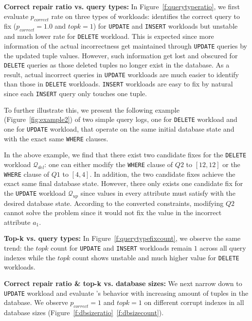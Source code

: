 \textbf{Correct repair ratio vs. query types: } In Figure~\ref{f:querytyperatio}, we first evaluate $p_{correct}$ rate on three types of workloads: \sys identifies the correct query to fix ($p_{correct} = 1.0$ and $topk = 1$) for \texttt{UPDATE} and \texttt{INSERT} workloads but unstable and much lower rate for \texttt{DELETE} workload. This is expected since more information of the actual incorrectness get maintained through \texttt{UPDATE} queries by the updated tuple values.  However, such information get lost and obscured for \texttt{DELETE} queries as those deleted tuples no longer exist in the database. As a result, actual incorrect queries in \texttt{UPDATE} workloads are much easier to identify than those in \texttt{DELETE} workloads. \texttt{INSERT} workloads are easy to fix by natural since each \texttt{INSERT} query only touches one tuple. 

To further illustrate this, we present the following  example (Figure~\ref{fig:example2}) of two simple query logs, one for \texttt{DELETE} workload and one for \texttt{UPDATE} workload, that operate on the same initial database state and with the exact same \texttt{WHERE} clauses. 

In the above example, we find that there exist two candidate fixes for the \texttt{DELETE} workload $\mathcal{Q}_{del}$: one can either modify the \texttt{WHERE} clause of $Q2$ to $[12, 12]$ or the \texttt{WHERE} clause of $Q1$ to $[4, 4]$. In addition, the two candidate fixes achieve the exact same final database state. However, there only exists one candidate fix for the \texttt{UPDATE} workload $\mathcal{Q}_{up}$ since values in every attribute must satisfy with the desired database state. According to the converted constraints, modifying $Q2$ cannot solve the problem since it would not fix the value in the incorrect attribute $a_1$.  

\textbf{Top-k vs. query types: } In Figure~\ref{f:querytypefixcount}, we observe the same trend: the $topk$ count for \texttt{UPDATE} and \texttt{INSERT} workloads remain $1$ across all query indexes while the $topk$ count shows unstable and much higher value for \texttt{DELETE} workloads. 


\textbf{Correct repair ratio \& top-k vs. database sizes: } We next narrow down to \texttt{UPDATE} workload and evaluate \sys's behavior with increasing amount of tuples in the database. We observe $p_{correct} = 1$ and $topk = 1$ on different corrupt indexes in all database sizes (Figure~\ref{f:dbsizeratio}~\ref{f:dbsizecount}). 

